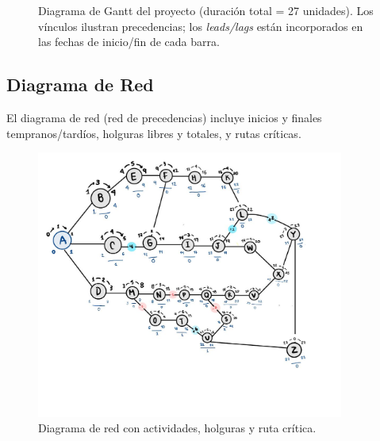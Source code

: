 \begin{figure}[H]
\begin{ganttchart}







\end{ganttchart}
\caption{Diagrama de Gantt del proyecto (duración total = 27 unidades). Los vínculos ilustran precedencias; los \emph{leads/lags} están incorporados en las fechas de inicio/fin de cada barra.}
\label{fig:gantt}
\end{figure}

\subsection{Diagrama de Red}

El diagrama de red (red de precedencias) incluye inicios y finales tempranos/tardíos, holguras libres y totales, y rutas críticas.

\begin{figure}[H]
  \centering
  \includegraphics[width=0.9\textwidth]{Figures/0. General/network_diagram.jpeg}
  \caption{Diagrama de red con actividades, holguras y ruta crítica.}
  \label{fig:red}
\end{figure}

